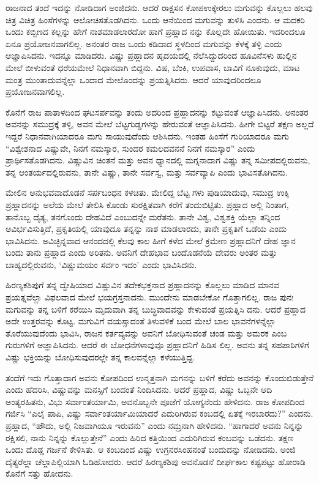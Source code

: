 \vskip 0.3cm

ರಾಜನಾದ ತಂದೆ ಇದನ್ನು ನೋಡಿದಾಗ ಅಂಜಿದನು. ಆದರೆ ರಾಕ್ಷಸನ ಕೋಪ\break ಉಕ್ಕೇರಲು ಮಗುವನ್ನು ಕೊಲ್ಲಲು ಹಲವು ಚಿತ್ರ ವಿಚಿತ್ರ ಹಿಂಸೆಗಳನ್ನು ಆಲೋಚಿಸತೊಡಗಿದನು. ಒಂದು ಆನೆಯಿಂದ ಮಗುವನ್ನು ತುಳಿಸಿ ಎಂದನು. ಆ ಮದಕರಿ ಒಂದು ಕಬ್ಬಿಣದ ಕಲ್ಲನ್ನು ಹೇಗೆ ನಾಶಮಾಡಲಾರದೋ ಹಾಗೆ ಪ್ರಹ್ಲಾದ ನನ್ನು ಕೊಲ್ಲದೇ ಹೋಯಿತು. ಇದರಿಂದಲೂ ಏನೂ ಪ್ರಯೋಜನವಾಗಲಿಲ್ಲ. ಅನಂತರ ರಾಜ ಒಂದು ಕಡಿದಾದ ಸ್ಥಳದಿಂದ ಮಗುವನ್ನು ಕೆಳಕ್ಕೆ ತಳ್ಳಿ ಎಂದು ಆಜ್ಞಾಪಿಸಿದನು. ಇದನ್ನೂ ಮಾಡಿದರು. ವಿಷ್ಣು ಪ್ರಹ್ಲಾದನ ಹೃದಯದಲ್ಲಿ ನೆಲೆಸಿದ್ದುದರಿಂದ ಹೂವಿನೆಸಳು ಹುಲ್ಲಿನ ಮೇಲೆ ಬೀಳುವಂತೆ ಧರೆಯಮೇಲೆ ನಿಧಾನವಾಗಿ ಬಿದ್ದನು. ವಿಷ, ಬೆಂಕಿ, ಉಪವಾಸ, ಬಾವಿಗೆ ನೂಕುವುದು, ಮಾಟ ಮಂತ್ರ ಮುಂತಾದುವನ್ನೆಲ್ಲಾ ಒಂದಾದ ಮೇಲೊಂದನ್ನು ಪ್ರಯತ್ನಿಸಿದರು. ಆದರೆ ಯಾವುದರಿಂದಲೂ ಪ್ರಯೋಜನವಾಗಲಿಲ್ಲ.

\vskip 0.3cm

ಕೊನೆಗೆ ರಾಜ ಪಾತಾಳದಿಂದ ಘಟಸರ್ಪವನ್ನು ತಂದು ಅದರಿಂದ ಪ್ರಹ್ಲಾದನನ್ನು ಕಟ್ಟುವಂತೆ ಆಜ್ಞಾಪಿಸಿದನು. ಅನಂತರ ಅವನನ್ನು ಸಮುದ್ರಕ್ಕೆ ತಳ್ಳಿ, ಅವನ ಮೇಲೆ ಬೆಟ್ಟಗುಡ್ಡಗಳನ್ನು ಹೇರುವಂತೆ ಆಜ್ಞಾಪಿಸಿದನು. ಹೀಗೇ ಬಿಟ್ಟರೆ ತಕ್ಷಣ ಅಲ್ಲದೆ ಇದ್ದರೆ ನಿಧಾನವಾಗಿಯಾದರೂ ಮಗು ಸಾಯುವುದೆಂದು ಆಶಿಸಿದನು. ಇಂತಹ ಹಿಂಸೆಗೆ ಗುರಿಯಾದರೂ ಮಗು “ವಿಶ್ವೇಶನಾದ ವಿಷ್ಣುವೇ, ನಿನಗೆ ನಮಸ್ಕಾರ, ಸುಂದರ ಕಮಲದವನನೆ ನಿನಗೆ ನಮಸ್ಕಾರ” ಎಂದು ಪ್ರಾರ್ಥಿಸತೊಡಗಿದನು. ವಿಷ್ಣುವಿನ ಚಿಂತನೆ ಮತ್ತು ಅವನ ಧ್ಯಾನದಲ್ಲಿ ಮಗ್ನನಾದಾಗ ವಿಷ್ಣು ತನ್ನ ಸಮೀಪದಲ್ಲಿರುವನು, ತನ್ನ ಆಂತರ್ಯದಲ್ಲಿರುವನು, ತಾನೇ ವಿಷ್ಣು, ತಾನೇ ಸರ್ವಸ್ವ, ಮತ್ತು ಸರ್ವವ್ಯಾಪಿ ಎಂದು ಭಾವಿಸತೊಗಿದನು.

ಮೇಲಿನ ಅನುಭವವಾದೊಡನೆ ಸರ್ಪಬಂಧನ ಕಳಚಿತು. ಮೇಲಿದ್ದ ಬೆಟ್ಟ ಗಳು ಪುಡಿಯಾದುವು, ಸಮುದ್ರ ಉಕ್ಕಿ ಪ್ರಹ್ಲಾದನನ್ನು ಅಲೆಯ ಮೇಲೆ ತೇಲಿಸಿ ಕೊಂಡು ಸುರಕ್ಷಿತವಾಗಿ ಕರೆಗೆ ತಂದುಬಿಟ್ಟಿತು. ಪ್ರಹ್ಲಾದ ಅಲ್ಲಿ ನಿಂತಾಗ, ತಾನೊಬ್ಬ ದೈತ್ಯ, ತನಗೊಂದು ದೇಹವಿದೆ ಎಂಬುದನ್ನೇ ಮರೆತನು. ತಾನೇ ವಿಶ್ವ, ವಿಶ್ವಶಕ್ತಿ ಯೆಲ್ಲಾ ತನ್ನಿಂದ ಆವಿರ್ಭವಿಸುತ್ತಿದೆ, ಪ್ರಕೃತಿಯಲ್ಲಿ ಯಾವುದೂ ತನ್ನನ್ನು ನಾಶ ಮಾಡಲಾರದು, ತಾನೇ ಪ್ರಕೃತಿಗೆ ಒಡೆಯ ಎಂದು ಭಾವಿಸಿದನು. ಅವಿಚ್ಛಿನ್ನವಾದ ಆನಂದದಲ್ಲಿ ಕೆಲವು ಕಾಲ ಹೀಗೆ ಕಳೆದ ಮೇಲೆ ಕ್ರಮೇಣ ಪ್ರಹ್ಲಾದನಿಗೆ ದೇಹ ಜ್ಞಾನ ಬಂದು ತಾನು ಪ್ರಹ್ಲಾದ ಎಂದು ಅರಿತನು. ಅವನಿಗೆ ದೇಹಭಾವ ಬಂದೊಡನೆಯೆ ದೇವರು ಅಂತರ ಮತ್ತು ಬಾಹ್ಯದಲ್ಲಿರುವನು, ‘ವಿಷ್ಣುಮಯಂ ಸರ್ವಂ ಇದಂ’ ಎಂದು ಭಾವಿಸಿದನು.

ಹಿರಣ್ಯಕಶಿಪುಗೆ ತನ್ನ ದ್ವೇಷಿಯಾದ ವಿಷ್ಣುವಿನ ತದೇಕಭಕ್ತನಾದ ಪ್ರಹ್ಲಾದನನ್ನು ಕೊಲ್ಲಲು ಮಾಡಿದ ಮಾನವ ಪ್ರಯತ್ನವೆಲ್ಲಾ ವಿಫಲವಾದ ಮೇಲೆ ಭಯಗ್ರಸ್ತನಾದನು. ಮುಂದೇನು ಮಾಡಬೇಕೋ ಗೊತ್ತಾಗಲಿಲ್ಲ. ರಾಜ ಪುನಃ ಮಗುವನ್ನು ತನ್ನ ಬಳಿಗೆ ಕರೆಯಿಸಿ ಮೃದುವಾಗಿ ತನ್ನ ಬುದ್ಧಿವಾದವನ್ನು ಕೇಳುವಂತೆ ಪ್ರಯತ್ನಿಸಿ ದನು. ಆದರೆ ಪ್ರಹ್ಲಾದ ಅದೇ ಉತ್ತರವನ್ನು ಕೊಟ್ಟ. ಮಗುವಿಗೆ ವಯಸ್ಸಾದಂತೆ ತಿಳುವಳಿಕೆ ಬಂದ ಮೇಲೆ ಬಾಲ ಭಾವನೆಗಳನ್ನೆಲ್ಲಾ ತೊರೆಯುವುದೆಂದು ಭಾವಿಸಿ, ರಾಜನ ಕರ್ತವ್ಯವನ್ನು ಅವನಿಗೆ ಬೋಧಿಸುವಂತೆ ಚಂಡ ಮತ್ತು ಅಮರಕ ಎಂಬ ಗುರುಗಳಿಗೆ ಅಜ್ಞಾಪಿಸಿದನು. ಆದರೆ ಈ ಬೋಧನೆಗಳಾವುವೂ ಪ್ರಹ್ಲಾದನಿಗೆ ಹಿಡಿಸ ಲಿಲ್ಲ. ಅವನು ತನ್ನ ಸಹಪಾಠಿಗಳಿಗೆ ವಿಷ್ಣು ಭಕ್ತಿಯನ್ನು ಬೋಧಿಸುವುದರಲ್ಲೇ ತನ್ನ ಕಾಲವನ್ನೆಲ್ಲಾ ಕಳೆಯುತ್ತಿದ್ದ.

ತಂದೆಗೆ ಇದು ಗೊತ್ತಾದಾಗ ಅವನು ಕೋಪದಿಂದ ಉನ್ಮತ್ತನಾಗಿ ಮಗನನ್ನು ಬಳಿಗೆ ಕರೆದು ಅವನನ್ನು ಕೊಂದುಬಿಡುತ್ತೇನೆ ಎಂದು ಹೆದರಿಸಿ, ವಿಷ್ಣುವನ್ನು ಮನಸ್ಸಿಗೆ ಬಂದಂತೆ ನಿಂದಿಸಿದನು. ಆದರೆ ಪ್ರಹ್ಲಾದ, ವಿಷ್ಣು ಒಬ್ಬನೇ ಆದಿ ಅಂತ್ಯರಹಿತನು, ವಿಭು ಸರ್ವಾಂತ\break ರ್ಯಾಮಿ, ಅವನೊಬ್ಬನೇ ಪೂಜೆಗೆ ಯೋಗ್ಯನೆಂದು ಹೇಳಿದನು. ರಾಜ ಕೋಪದಿಂದ ಗರ್ಜಿಸಿ “ಎಲೈ ಪಾಪಿ, ವಿಷ್ಣು ಸರ್ವಾಂತರ್ಯಾಮಿಯಾದರೆ ಎದುರಿಗಿರುವ ಕಂಬದಲ್ಲಿ ಏತಕ್ಕೆ ಇರಬಾರದು?” ಎಂದನು. ಪ್ರಹ್ಲಾದ, “ಹೌದು, ಅಲ್ಲಿ ನಿಜವಾಗಿಯೂ ಇರುವನು” ಎಂದು ನಮ್ರನಾಗಿ ಹೇಳಿದನು. “ಹಾಗಾದರೆ ಅವನು ನಿನ್ನನ್ನು ರಕ್ಷಿಸಲಿ, ನಾನು ನಿನ್ನನ್ನು ಕೊಲ್ಲುತ್ತೇನೆ” ಎಂದು ಹಿರಿದ ಕತ್ತಿಯಿಂದ ಎದುರಿಗಿರುವ ಕಂಬವನ್ನು ಒಡೆದನು. ತಕ್ಷಣ ಒಂದು ದೊಡ್ಡ ಗರ್ಜನೆ ಕೇಳಿಸಿತು. ಆ ಕಂಬದಿಂದ ವಿಷ್ಣು ಉಗ್ರನರಸಿಂಹನಂತೆ ಬಂದುದನ್ನು ನೋಡಿದನು. ಅಂಜಿ ದೈತ್ಯರೆಲ್ಲಾ ಚೆಲ್ಲಾಪಿಲ್ಲಿಯಾಗಿ ಓಡಿಹೋದರು. ಆದರೆ ಹಿರಣ್ಯಕಶಿಪು ಅವನೊಡನೆ ದೀರ್ಘಕಾಲ ಕಷ್ಟಪಟ್ಟು ಹೋರಾಡಿ ಕೊನೆಗೆ ಸತ್ತು ಹೋದನು.

